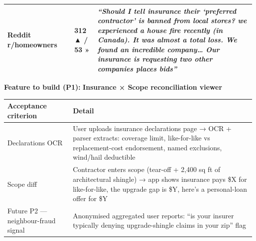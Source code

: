 \documentclass[
  10pt,
]{article}
\let\origtexttt\texttt
\renewcommand{\texttt}[1]{\origtexttt{\seqsplit{#1}}}
\begin{document}
\begin{longtable}[]{@{}llll@{}}
\begin{minipage}[t]{0.20\columnwidth}
Reddit r/homeowners\strut
\end{minipage} & \begin{minipage}[t]{0.14\columnwidth}\raggedright
\texttt{1ndefiv}\strut
\end{minipage} & \begin{minipage}[t]{0.10\columnwidth}\raggedright
312 ▲ / 53 »\strut
\end{minipage} & \begin{minipage}[t]{0.44\columnwidth}\raggedright
\emph{``Should I tell insurance their `preferred contractor' is banned from local stores? we
experienced a house fire recently (in Canada). It was almost a total loss. We found an incredible
company\ldots{} Our insurance is requesting two other companies places bids''}\strut
\end{minipage}\tabularnewline
\bottomrule
\end{longtable}

\textbf{Feature to build (P1):} \textbf{Insurance × Scope reconciliation viewer}

\begin{longtable}[]{@{}ll@{}}
\toprule
\begin{minipage}[b]{0.47\columnwidth}\raggedright
Acceptance criterion\strut
\end{minipage} & \begin{minipage}[b]{0.47\columnwidth}\raggedright
Detail\strut
\end{minipage}\tabularnewline
\midrule
\endhead
\begin{minipage}[t]{0.47\columnwidth}\raggedright
Declarations OCR\strut
\end{minipage} & \begin{minipage}[t]{0.47\columnwidth}\raggedright
User uploads insurance declarations page → OCR + parser extracts: coverage limit, like-for-like vs
replacement-cost endorsement, named exclusions, wind/hail deductible\strut
\end{minipage}\tabularnewline
\begin{minipage}[t]{0.47\columnwidth}\raggedright
Scope diff\strut
\end{minipage} & \begin{minipage}[t]{0.47\columnwidth}\raggedright
Contractor enters scope (tear-off + 2,400 sq ft of architectural shingle) → app shows insurance pays
\$X for like-for-like, the upgrade gap is \$Y, here's a personal-loan offer for \$Y\strut
\end{minipage}\tabularnewline
\begin{minipage}[t]{0.47\columnwidth}\raggedright
Future P2 --- neighbour-fraud signal\strut
\end{minipage} & \begin{minipage}[t]{0.47\columnwidth}\raggedright
Anonymised aggregated user reports: ``is your insurer typically denying upgrade-shingle claims in
your zip'' flag\strut
\end{minipage}\tabularnewline
\bottomrule
\end{longtable}
\end{document}
